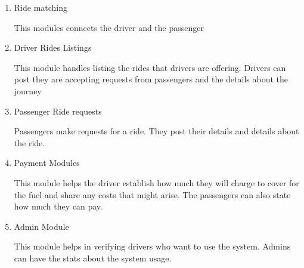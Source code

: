 
\begin{enumerate}
    \item Ride matching

          This modules connects the driver and the passenger

    \item Driver Rides Listings

          This module handles listing the rides that drivers are offering. Drivers can post they are accepting requests from passengers and the details about the journey

    \item Passenger Ride requests

          Passengers make requests for a ride. They post their details and details about the ride.

    \item Payment Modules

          This module helps the driver establish how much they will charge to cover for the fuel and share any costs that might arise. The passengers can also state how much they can pay.

    \item Admin Module

          This module helps in verifying drivers who want to use the system. Admins can have the stats about the system usage.
\end{enumerate}